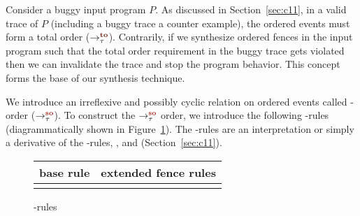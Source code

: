 Consider a buggy input program $P$.
%
As discussed in Section~\ref{sec:c11}, in a valid trace of $P$ 
(including a buggy trace \aka a counter example), 
the \sc ordered events must form a total order ($\setTO$).
%
Contrarily, if we synthesize \sc ordered fences in the input program 
such that the total order requirement in the buggy trace gets violated 
then we can invalidate the trace and stop the program behavior.
This concept forms the base of our synthesis technique.

We introduce an irreflexive and possibly cyclic relation
on \sc ordered events called \sc-order ($\setSO$).
%
To construct the $\setSO$ order, we introduce the following \lso-rules
(diagrammatically shown in Figure~\ref{fig:so rules}).
The \lso-rules are an interpretation or simply a derivative 
of the \lto-rules, ,  and  
(Section~\ref{sec:c11}).

\begin{figure}[t]
	\begin{tabular}{|c||c|c|c|}
		\multicolumn{1}{c}{base rule} & 
		\multicolumn{3}{c}{extended fence rules} \\\hline
		
		\resizebox{0.24\textwidth}{!}{} &
		\resizebox{0.24\textwidth}{!}{} &
		\resizebox{0.24\textwidth}{!}{} &
		\resizebox{0.24\textwidth}{!}{} \\
		\hline

%		
	\end{tabular}
	\caption{\lso-rules}
	\label{fig:so rules}
\end{figure}

